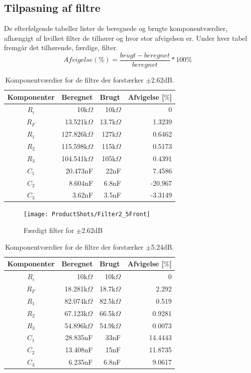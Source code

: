 \subsection{Tilpasning af filtre}
\label{TilpasningAfFilter}
%
De efterfølgende tabeller lister de beregnede og brugte komponentværdier, afhængigt af hvilket filter de tilhører og hvor stor afvigelsen er. Under hver tabel fremgår det tilhørende, færdige, filter.
%
\begin{equation}
	Afvigelse (\%) = \frac{brugt-beregnet}{beregnet}*100\%
\end{equation}
%
\begin{table}[H]
\centering
\begin{tabular}{|c|r|r|r|}
\hline
\multicolumn{1}{|l|}{Komponenter} & \multicolumn{1}{l|}{Beregnet} & \multicolumn{1}{l|}{Brugt} & \multicolumn{1}{l|}{Afvigelse [$\%$]}\\ \hline
$R_i$ & 10k$\Omega$ & 10k$\Omega$ & 0\\ \hline
$R_F$ & 13.521k$\Omega$ & 13.7k$\Omega$ & 1.3239 \\ \hline
$R_1$ & 127.826k$\Omega$ & 127k$\Omega$ & 0.6462\\ \hline
$R_2$ & 115.598k$\Omega$ & 115k$\Omega$ & 0.5173 \\ \hline
$R_3$ & 104.541k$\Omega$ & 105k$\Omega$ & 0.4391 \\ \hline
$C_1$ & 20.473nF & 22nF & 7.4586 \\ \hline
$C_2$ & 8.604nF & 6.8nF & -20.967 \\ \hline
$C_3$ & 3.62nF & 3.5nF & -3.3149 \\ \hline
\end{tabular}
\caption{Komponentværdier for de filtre der forstærker $\pm$2.62dB.}
\label{tab:TilpasningAfFiltre2.62}
\end{table}
%
\begin{figure}[H]
	\centering
	\texttt{[image: ProductShots/Filter2\_5Front]}
	\caption{Færdigt filter for $\pm$2.62dB}
	\label{fig:Filter2_5Front}
\end{figure}
\noindent
%
%
\begin{table}[H]
\centering
\begin{tabular}{|c|r|r|r|}
\hline
\multicolumn{1}{|l|}{Komponenter} & \multicolumn{1}{l|}{Beregnet} & \multicolumn{1}{l|}{Brugt} & \multicolumn{1}{l|}{Afvigelse [$\%$]}\\ \hline
$R_i$ & 10k$\Omega$ & 10k$\Omega$ & 0\\ \hline
$R_F$ & 18.281k$\Omega$ & 18.7k$\Omega$ & 2.292 \\ \hline
$R_1$ & 82.074k$\Omega$ & 82.5k$\Omega$ & 0.519 \\ \hline
$R_2$ & 67.123k$\Omega$ & 66.5k$\Omega$ & 0.9281 \\ \hline
$R_3$ & 54.896k$\Omega$ & 54.9k$\Omega$ & 0.0073 \\ \hline
$C_1$ & 28.835nF & 33nF & 14.4443 \\ \hline
$C_2$ & 13.408nF & 15nF & 11.8735 \\ \hline
$C_3$ & 6.235nF & 6.8nF & 9.0617 \\ \hline
\end{tabular}
\caption{Komponentværdier for de filtre der forstærker $\pm$5.24dB.}
\label{tab:TilpasningAfFiltre5.24}
\end{table}
